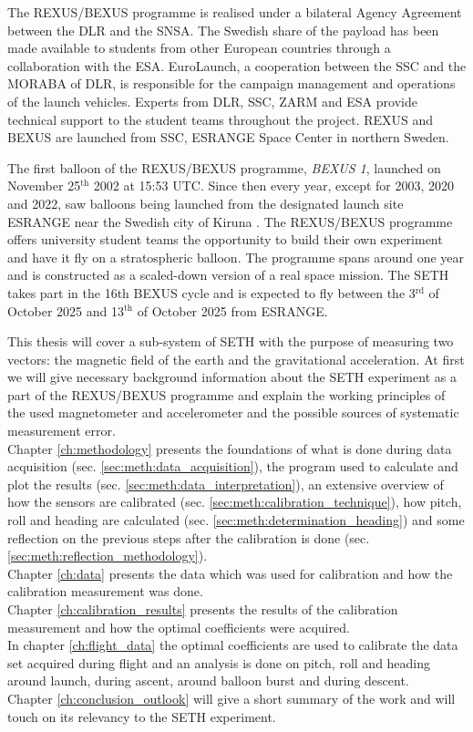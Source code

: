 The \acs{REXUS}/\acs{BEXUS} programme is realised under a bilateral Agency Agreement between the \acf{DLR} and the \acf{SNSA}. The Swedish share of the payload has been made available to students from other European countries through a collaboration with the \acf{ESA}. EuroLaunch, a cooperation between the \acf{SSC} and the \acf{MORABA} of \acs{DLR}, is responsible for the campaign management and operations of the launch vehicles. Experts from \acs{DLR}, \acs{SSC}, \acs{ZARM} and \acs{ESA} provide technical support to the student teams throughout the project. \acs{REXUS} and \acs{BEXUS} are launched from \acs{SSC}, \acs{ESRANGE} Space Center in northern Sweden.

The first balloon of the \ac{REXUS}/\ac{BEXUS} programme, \textit{BEXUS 1}, launched on November 25$^{\mathrm{th}}$ 2002 at 15:53 UTC. Since then every year, except for 2003, 2020 and 2022, saw balloons being launched from the designated launch site \ac{ESRANGE} near the Swedish city of Kiruna \parencite{IAC-08.E.1.1.4}\parencite{bexus-campaign-history}.
The \ac{REXUS}/\ac{BEXUS} programme offers university student teams the opportunity to build their own experiment and have it fly on a stratospheric balloon. The programme spans around one year and is constructed as a scaled-down version of a real space mission. The \ac{SETH} takes part in the 16th \ac{BEXUS} cycle and is expected to fly between the 3$^\mathrm{rd}$ of October 2025 and 13$^\mathrm{th}$ of October 2025 from \ac{ESRANGE}.

This thesis will cover a sub-system of \ac{SETH} with the purpose of measuring two vectors: the magnetic field of the earth and the gravitational acceleration. At first we will give necessary background information about the \ac{SETH} experiment as a part of the \ac{REXUS}/\ac{BEXUS} programme and explain the working principles of the used magnetometer and accelerometer and the possible sources of systematic measurement error.\\
Chapter \ref{ch:methodology} presents the foundations of what is done during data acquisition (sec. \ref{sec:meth:data_acquisition}), the program used to calculate and plot the results (sec. \ref{sec:meth:data_interpretation}), an extensive overview of how the sensors are calibrated (sec. \ref{sec:meth:calibration_technique}), how pitch, roll and heading are calculated (sec. \ref{sec:meth:determination_heading}) and some reflection on the previous steps after the calibration is done (sec. \ref{sec:meth:reflection_methodology}).\\
Chapter \ref{ch:data} presents the data which was used for calibration and how the calibration measurement was done.\\
Chapter \ref{ch:calibration_results} presents the results of the calibration measurement and how the optimal coefficients were acquired.\\
In chapter \ref{ch:flight_data} the optimal coefficients are used to calibrate the data set acquired during flight and an analysis is done on pitch, roll and heading around launch, during ascent, around balloon burst and during descent.\\
Chapter \ref{ch:conclusion_outlook} will give a short summary of the work and will touch on its relevancy to the \ac{SETH} experiment.